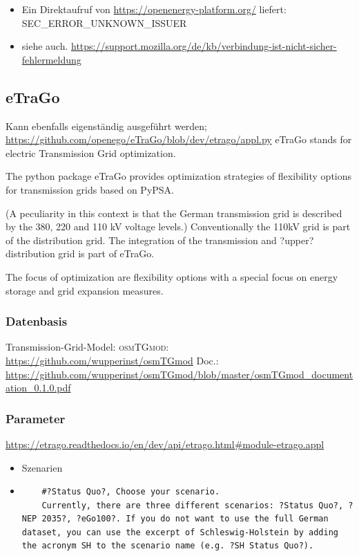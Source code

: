 \documentclass[
a4paper,     %
12pt         %
]{scrartcl}  %
\begin{document}
\begin{itemize}
\begin{itemize}
\begin{lstlisting}[language=bash]
		\end{lstlisting}

		\item Ein Direktaufruf von \url{https://openenergy-platform.org/} liefert:\\ \textsc{SEC\_ERROR\_UNKNOWN\_ISSUER}\\
		\item siehe auch. \url{https://support.mozilla.org/de/kb/verbindung-ist-nicht-sicher-fehlermeldung}
	\end{itemize}
\end{itemize}

\subsection{eTraGo}
Kann ebenfalls eigenständig ausgeführt werden;
\url{https://github.com/openego/eTraGo/blob/dev/etrago/appl.py}
eTraGo stands for electric Transmission Grid optimization.

The python package eTraGo provides optimization strategies of flexibility options for transmission grids based on PyPSA.

(A peculiarity in this context is that the German transmission grid is described by the 380, 220 and 110 kV voltage levels.)
Conventionally the 110kV grid is part of the distribution grid. The integration of the transmission and ?upper? distribution grid is part of eTraGo.

The focus of optimization are flexibility options with a special focus on energy storage and grid expansion measures.
\subsubsection{Datenbasis}
Transmission-Grid-Model: \textsc{osmTGmod}:
\url{https://github.com/wupperinst/osmTGmod}
Doc.: \url{https://github.com/wupperinst/osmTGmod/blob/master/osmTGmod_documentation_0.1.0.pdf}

\subsubsection{Parameter}
\url{https://etrago.readthedocs.io/en/dev/api/etrago.html#module-etrago.appl}
\begin{itemize}
	\item Szenarien
	\item[] \begin{lstlisting}
	#?Status Quo?, Choose your scenario.
	Currently, there are three different scenarios: ?Status Quo?, ?NEP 2035?, ?eGo100?. If you do not want to use the full German dataset, you can use the excerpt of Schleswig-Holstein by adding the acronym SH to the scenario name (e.g. ?SH Status Quo?).
	\end{lstlisting}
\end{itemize}
\end{document}
